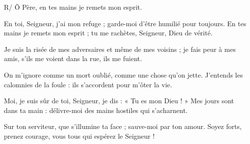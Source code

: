 
R/ Ô Père, en tes mains
je remets mon esprit.

\smallskip
En toi, Seigneur, j’ai mon refuge ;
garde-moi d’être humilié pour toujours.
En tes mains je remets mon esprit ;
tu me rachètes, Seigneur, Dieu de vérité.

\smallskip
Je suis la risée de mes adversaires
et même de mes voisins ;
je fais peur à mes amis,
s’ils me voient dans la rue, ils me fuient.

\smallskip
On m’ignore comme un mort oublié,
comme une chose qu’on jette.
J’entends les calomnies de la foule :
ils s’accordent pour m’ôter la vie.

\smallskip
Moi, je suis sûr de toi, Seigneur,
je dis : « Tu es mon Dieu ! »
Mes jours sont dans ta main : délivre-moi
des mains hostiles qui s’acharnent.

\smallskip
Sur ton serviteur, que s’illumine ta face ;
sauve-moi par ton amour.
Soyez forts, prenez courage,
vous tous qui espérez le Seigneur !
